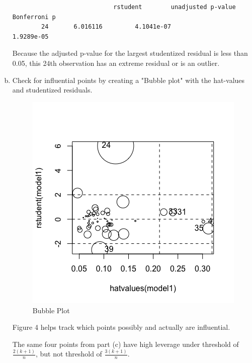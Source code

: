 \documentclass[12pt,letterpaper]{article}
\begin{document}
\begin{enumerate}[(a)]
	\begin{verbatim}
		 			      	rstudent  		unadjusted p-value 		Bonferroni p
		24 	     6.016116         4.1041e-07   					1.9289e-05
	\end{verbatim} 
	
	Because the adjusted p-value for the largest studentized residual is less than 0.05, this 24th observation has an extreme residual or is an outlier.
	
	\vspace{.6cm}
	
	\item Check for influential points by creating a "Bubble plot" with the hat-values and studentized residuals.
	
	
	
	\begin{figure}[h!]
		\caption{\footnotesize{Bubble Plot}}
		\vspace{.1cm}
		\centering
		\label{fig:bubble}
		\includegraphics[width=1\textwidth]{./PS5_Graph_4.png}
	\end{figure}
	
	Figure 4 helps track which points possibly and actually are influential.
	
	The same four points from part (c) have high leverage under threshold of $\frac{2(k + 1)}{n}$, but not threshold of $\frac{3(k + 1)}{n}$. 
	

\end{enumerate}
\end{document}
